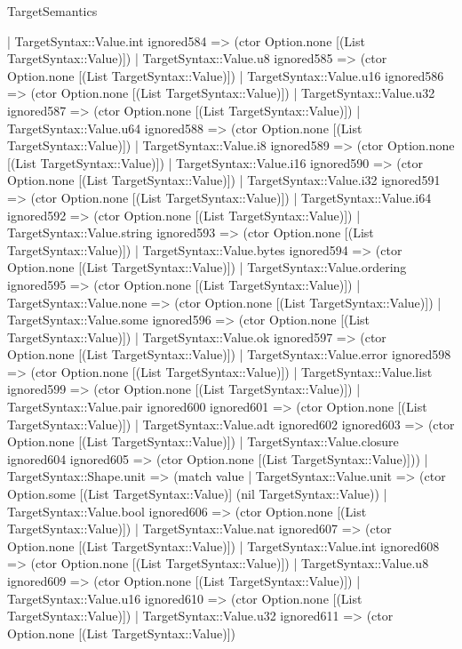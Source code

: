 \begin{lexlean}{TargetSemantics}
\begin{semanticmodule}
{      | TargetSyntax::Value.int ignored584 => (ctor Option.none [(List TargetSyntax::Value)])
      | TargetSyntax::Value.u8 ignored585 => (ctor Option.none [(List TargetSyntax::Value)])
      | TargetSyntax::Value.u16 ignored586 => (ctor Option.none [(List TargetSyntax::Value)])
      | TargetSyntax::Value.u32 ignored587 => (ctor Option.none [(List TargetSyntax::Value)])
      | TargetSyntax::Value.u64 ignored588 => (ctor Option.none [(List TargetSyntax::Value)])
      | TargetSyntax::Value.i8 ignored589 => (ctor Option.none [(List TargetSyntax::Value)])
      | TargetSyntax::Value.i16 ignored590 => (ctor Option.none [(List TargetSyntax::Value)])
      | TargetSyntax::Value.i32 ignored591 => (ctor Option.none [(List TargetSyntax::Value)])
      | TargetSyntax::Value.i64 ignored592 => (ctor Option.none [(List TargetSyntax::Value)])
      | TargetSyntax::Value.string ignored593 => (ctor Option.none [(List TargetSyntax::Value)])
      | TargetSyntax::Value.bytes ignored594 => (ctor Option.none [(List TargetSyntax::Value)])
      | TargetSyntax::Value.ordering ignored595 => (ctor Option.none [(List TargetSyntax::Value)])
      | TargetSyntax::Value.none => (ctor Option.none [(List TargetSyntax::Value)])
      | TargetSyntax::Value.some ignored596 => (ctor Option.none [(List TargetSyntax::Value)])
      | TargetSyntax::Value.ok ignored597 => (ctor Option.none [(List TargetSyntax::Value)])
      | TargetSyntax::Value.error ignored598 => (ctor Option.none [(List TargetSyntax::Value)])
      | TargetSyntax::Value.list ignored599 => (ctor Option.none [(List TargetSyntax::Value)])
      | TargetSyntax::Value.pair ignored600 ignored601 => (ctor Option.none [(List TargetSyntax::Value)])
      | TargetSyntax::Value.adt ignored602 ignored603 => (ctor Option.none [(List TargetSyntax::Value)])
      | TargetSyntax::Value.closure ignored604 ignored605 => (ctor Option.none [(List TargetSyntax::Value)]))
    | TargetSyntax::Shape.unit => (match value
      | TargetSyntax::Value.unit => (ctor Option.some [(List TargetSyntax::Value)] (nil TargetSyntax::Value))
      | TargetSyntax::Value.bool ignored606 => (ctor Option.none [(List TargetSyntax::Value)])
      | TargetSyntax::Value.nat ignored607 => (ctor Option.none [(List TargetSyntax::Value)])
      | TargetSyntax::Value.int ignored608 => (ctor Option.none [(List TargetSyntax::Value)])
      | TargetSyntax::Value.u8 ignored609 => (ctor Option.none [(List TargetSyntax::Value)])
      | TargetSyntax::Value.u16 ignored610 => (ctor Option.none [(List TargetSyntax::Value)])
      | TargetSyntax::Value.u32 ignored611 => (ctor Option.none [(List TargetSyntax::Value)])
}
\end{semanticmodule}
\end{lexlean}
